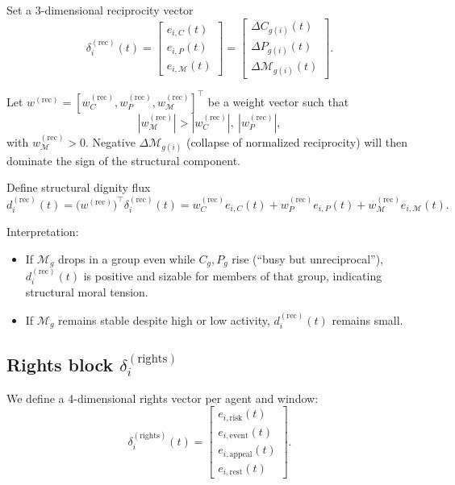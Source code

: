 \documentclass[11pt]{article}
\begin{document}
Set a 3-dimensional reciprocity vector
\[
\delta_i^{(\text{rec})}(t) =
\begin{bmatrix}
e_{i,C}(t) \\
e_{i,P}(t) \\
e_{i,\mathcal{M}}(t)
\end{bmatrix}
=
\begin{bmatrix}
\Delta C_{g(i)}(t) \\
\Delta P_{g(i)}(t) \\
\Delta \mathcal{M}_{g(i)}(t)
\end{bmatrix}.
\]

Let \(w^{(\text{rec})} = [w_C^{(\text{rec})}, w_P^{(\text{rec})}, w_{\mathcal{M}}^{(\text{rec})}]^\top\) be a weight vector such that
\[
|w_{\mathcal{M}}^{(\text{rec})}| > |w_C^{(\text{rec})}|,\ |w_P^{(\text{rec})}|,
\]
with \(w_{\mathcal{M}}^{(\text{rec})} > 0\).
Negative \(\Delta \mathcal{M}_{g(i)}\) (collapse of normalized reciprocity) will then dominate the sign of the structural component.

Define structural dignity flux
\[
d_i^{(\text{rec})}(t) = \big(w^{(\text{rec})}\big)^\top \delta_i^{(\text{rec})}(t)
= w_C^{(\text{rec})} e_{i,C}(t) + w_P^{(\text{rec})} e_{i,P}(t) + w_{\mathcal{M}}^{(\text{rec})} e_{i,\mathcal{M}}(t).
\]

Interpretation:
\begin{itemize}[leftmargin=*]
  \item If \(\mathcal{M}_g\) drops in a group even while \(C_g, P_g\) rise (``busy but unreciprocal''), \(d_i^{(\text{rec})}(t)\) is positive and sizable for members of that group, indicating structural moral tension.
  \item If \(\mathcal{M}_g\) remains stable despite high or low activity, \(d_i^{(\text{rec})}(t)\) remains small.
\end{itemize}

\subsection{Rights block \texorpdfstring{\(\delta_i^{(\text{rights})}\)}{delta\_i\^rights}}

We define a 4-dimensional rights vector per agent and window:
\[
\delta_i^{(\text{rights})}(t) =
\begin{bmatrix}
e_{i,\text{risk}}(t) \\
e_{i,\text{event}}(t) \\
e_{i,\text{appeal}}(t) \\
e_{i,\text{rest}}(t)
\end{bmatrix}.
\]
\end{document}
